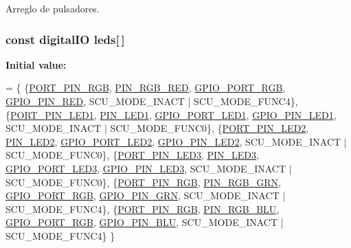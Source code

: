 Arreglo de pulsadores. 

\subsubsection[{\texorpdfstring{leds}{leds}}]{\setlength{\rightskip}{0pt plus 5cm}const {\bf digital\+IO} leds\mbox{[}$\,$\mbox{]}}\hypertarget{group__operaciones_ga9b625a8f4af05b1e2bdb0230a6440c77}{}\label{group__operaciones_ga9b625a8f4af05b1e2bdb0230a6440c77}
{\bfseries Initial value\+:}
\begin{DoxyCode}
=
\{
        \{\hyperlink{group__hardware_ga372c868d523a46916b874b4e3c5722f5}{PORT\_PIN\_RGB}, \hyperlink{group__hardware_gaf3069b94e5b50d3558f6c36dd2e7ab15}{PIN\_RGB\_RED}, \hyperlink{group__hardware_ga9e2ed2756af597d0ec2ee618ef235c7e}{GPIO\_PORT\_RGB}, 
      \hyperlink{group__hardware_gaa4aae4b49bb53e52b78b530637dcd2d7}{GPIO\_PIN\_RED}, SCU\_MODE\_INACT | SCU\_MODE\_FUNC4\},
        \{\hyperlink{group__hardware_ga281151e2a661c8ad6893aee42b0024c4}{PORT\_PIN\_LED1}, \hyperlink{group__hardware_ga1ee291f6ef730418abd5997176fe6b4c}{PIN\_LED1}, \hyperlink{group__hardware_ga04c3e41fb79d2904c2358a42414bbf7f}{GPIO\_PORT\_LED1}, 
      \hyperlink{group__hardware_gaa4637d2cb87305ea71351291117a95f6}{GPIO\_PIN\_LED1}, SCU\_MODE\_INACT | SCU\_MODE\_FUNC0\},
        \{\hyperlink{group__hardware_ga3039da47774de5edf9a11968103d87c5}{PORT\_PIN\_LED2}, \hyperlink{group__hardware_gaa10e44027a1a9f0ac7cba19e815205a8}{PIN\_LED2}, \hyperlink{group__hardware_gab971c6f67d136a9b870fac0f500685d4}{GPIO\_PORT\_LED2}, 
      \hyperlink{group__hardware_ga5ada73f73636a4fbf726468eb63eb945}{GPIO\_PIN\_LED2}, SCU\_MODE\_INACT | SCU\_MODE\_FUNC0\},
        \{\hyperlink{group__hardware_ga097e347296860c96d104ef8ab90dac33}{PORT\_PIN\_LED3}, \hyperlink{group__hardware_ga95a9a1b175a118c828537db81141eb3d}{PIN\_LED3}, \hyperlink{group__hardware_ga8b63f7f606f2b1ec7d88205ee6c514ea}{GPIO\_PORT\_LED3}, 
      \hyperlink{group__hardware_ga9e7e83187eae26d02136f609392fabd0}{GPIO\_PIN\_LED3}, SCU\_MODE\_INACT | SCU\_MODE\_FUNC0\},
        \{\hyperlink{group__hardware_ga372c868d523a46916b874b4e3c5722f5}{PORT\_PIN\_RGB}, \hyperlink{group__hardware_ga298bb5d50ab2ba7b00df1c59087de286}{PIN\_RGB\_GRN}, \hyperlink{group__hardware_ga9e2ed2756af597d0ec2ee618ef235c7e}{GPIO\_PORT\_RGB}, 
      \hyperlink{group__hardware_ga8ce252c71154210c65808a2170d74223}{GPIO\_PIN\_GRN}, SCU\_MODE\_INACT | SCU\_MODE\_FUNC4\},
        \{\hyperlink{group__hardware_ga372c868d523a46916b874b4e3c5722f5}{PORT\_PIN\_RGB}, \hyperlink{group__hardware_gadf8d2d730566aede36c12ccfbc03b1b7}{PIN\_RGB\_BLU}, \hyperlink{group__hardware_ga9e2ed2756af597d0ec2ee618ef235c7e}{GPIO\_PORT\_RGB}, 
      \hyperlink{group__hardware_ga2aa9b3c113e9f52a2e04ff811b8ec518}{GPIO\_PIN\_BLU}, SCU\_MODE\_INACT | SCU\_MODE\_FUNC4\}
\}
\end{DoxyCode}


